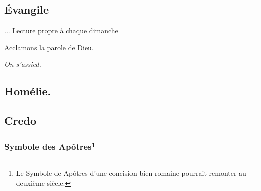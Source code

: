 \subsection{Évangile}


... Lecture propre à chaque dimanche

Acclamons la parole de Dieu.


\emph{On s'assied.}

\subsection{Homélie.}


\subsection{Credo}

\subsubsection{Symbole des Apôtres\footnote{Le Symbole de Apôtres d’une concision bien romaine pourrait remonter au deuxième siècle. }}


